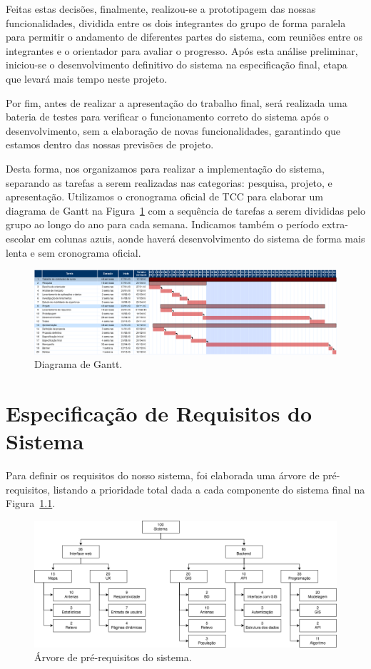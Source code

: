 \documentclass[]{politex}
\begin{document}
Feitas estas decisões, finalmente, realizou-se a prototipagem das nossas
funcionalidades, dividida entre os dois integrantes do grupo de forma paralela
para permitir o andamento de diferentes partes do sistema, com reuniões entre
os integrantes e o orientador para avaliar o progresso. Após esta análise
preliminar, iniciou-se o desenvolvimento definitivo do sistema na especificação
final, etapa que levará mais tempo neste projeto.

Por fim, antes de realizar a apresentação do trabalho final, será realizada uma
bateria de testes para verificar o funcionamento correto do sistema após o
desenvolvimento, sem a elaboração de novas funcionalidades, garantindo que
estamos dentro das nossas previsões de projeto.

Desta forma, nos organizamos para realizar a implementação do sistema, separando
as tarefas a serem realizadas nas categorias: pesquisa, projeto, e apresentação.
Utilizamos o cronograma oficial de TCC para elaborar um diagrama de Gantt na
Figura~\ref{fig:gantt} com a sequência de tarefas a serem divididas pelo grupo
ao longo do ano para cada semana. Indicamos também o período extra-escolar em
colunas azuis, aonde haverá desenvolvimento do sistema de forma mais lenta e
sem cronograma oficial.

\begin{figure}[H]
    \centering
    \includegraphics[width=6.5in]{imagens/diagrama_gantt}
    \caption{Diagrama de Gantt.}
    \label{fig:gantt}
  \end{figure}


\chapter{Especificação de Requisitos do Sistema}
Para definir os requisitos do nosso sistema, foi elaborada uma árvore de
pré-requisitos, listando a prioridade total dada a cada componente do sistema
final na Figura~\ref{fig:arvore_prerequisitos}.

\begin{figure}[H]
  \centering
  \includegraphics[width=6in]{imagens/arvore_prerequisitos}
  \caption{Árvore de pré-requisitos do sistema.}
  \label{fig:arvore_prerequisitos}
\end{figure}
\end{document}
